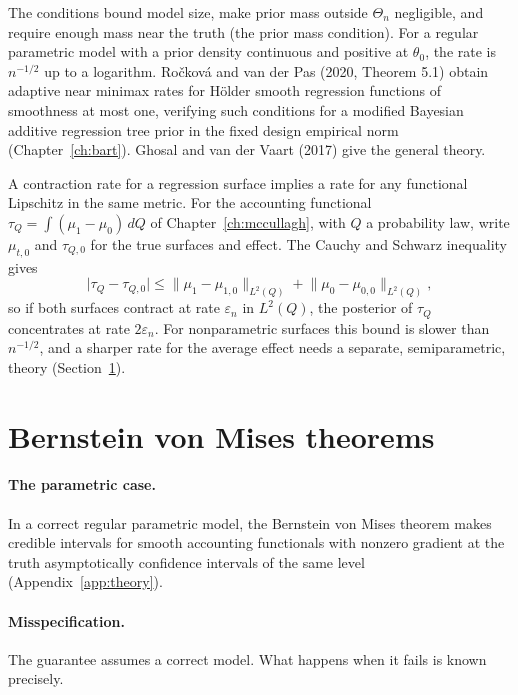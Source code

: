The conditions bound model size, make prior mass outside $\Theta_n$ negligible, and require enough mass near the truth (the prior mass condition). For a regular parametric model with a prior density continuous and positive at $\theta_0$, the rate is $n^{-1/2}$ up to a logarithm. Ro\v{c}kov\'a and van der Pas (2020, Theorem 5.1) obtain adaptive near minimax rates for H\"older smooth regression functions of smoothness at most one, verifying such conditions for a modified Bayesian additive regression tree prior in the fixed design empirical norm (Chapter~\ref{ch:bart}). Ghosal and van der Vaart (2017) give the general theory.

A contraction rate for a regression surface implies a rate for any functional Lipschitz in the same metric. For the accounting functional $\tau_Q = \int(\mu_1 - \mu_0)\,dQ$ of Chapter~\ref{ch:mccullagh}, with $Q$ a probability law, write $\mu_{t,0}$ and $\tau_{Q,0}$ for the true surfaces and effect. The Cauchy and Schwarz inequality gives
\[
\lvert\tau_Q-\tau_{Q,0}\rvert\le\lVert\mu_1-\mu_{1,0}\rVert_{L^2(Q)}+\lVert\mu_0-\mu_{0,0}\rVert_{L^2(Q)},
\]
so if both surfaces contract at rate $\varepsilon_n$ in $L^2(Q)$, the posterior of $\tau_Q$ concentrates at rate $2\varepsilon_n$. For nonparametric surfaces this bound is slower than $n^{-1/2}$, and a sharper rate for the average effect needs a separate, semiparametric, theory (Section~\ref{pg:sec:bvm}).

\section{Bernstein von Mises theorems}\label{pg:sec:bvm}

\paragraph{The parametric case.} In a correct regular parametric model, the Bernstein von Mises theorem makes credible intervals for smooth accounting functionals with nonzero gradient at the truth asymptotically confidence intervals of the same level (Appendix~\ref{app:theory}).

\paragraph{Misspecification.} The guarantee assumes a correct model. What happens when it fails is known precisely.

